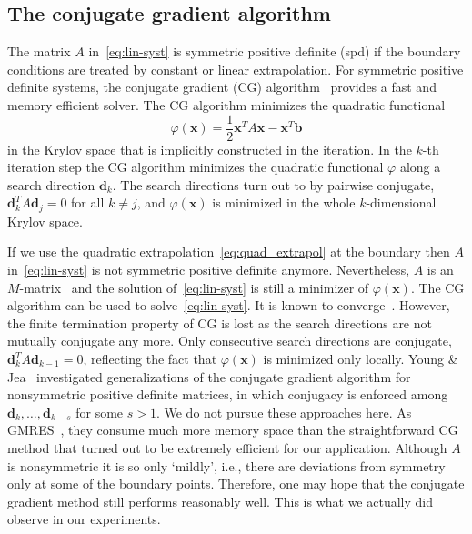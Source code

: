 \documentclass[a4paper,10pt,3p,final,pdftex]{elsarticle}
\begin{document}
\subsection{The conjugate gradient algorithm}

The matrix $A$ in~\eqref{eq:lin-syst} is symmetric positive definite
(spd) if the boundary conditions are treated by constant or linear
extrapolation.  For symmetric positive definite systems, the conjugate
gradient (CG) algorithm~\cite{hack:94,hest:52} provides a fast and
memory efficient solver.  The CG algorithm minimizes the quadratic
functional
\begin{equation} \label{eq:cg-funct}
  \varphi(\mathbf{x}) = \frac{1}{2}\mathbf{x}^T A \mathbf{x} - \mathbf{x}^T
  \mathbf{b}
\end{equation}
in the Krylov space that is implicitly constructed in the iteration.  In
the $k$-th iteration step the CG algorithm minimizes the quadratic
functional $\varphi$ along a search direction $\mathbf{d}_k$.  The search
directions turn out to by pairwise conjugate, $\mathbf{d}_k^T A
\mathbf{d}_j = 0$ for all $k\neq j$, and $\varphi(\mathbf{x})$ is
minimized in the whole $k$-dimensional Krylov space.

If we use the quadratic extrapolation~\eqref{eq:quad_extrapol} at the
boundary then $A$ in~\eqref{eq:lin-syst} is not symmetric positive
definite anymore.  Nevertheless, $A$ is an $M$-matrix~\cite{hack:94} and
the solution of~\eqref{eq:lin-syst} is still a minimizer of
$\varphi(\mathbf{x})$.  The CG algorithm can be used to
solve~\eqref{eq:lin-syst}.  It is known to converge~\cite{gree:97}.
However, the finite termination property of CG is lost as the search
directions are not mutually conjugate any more.  Only consecutive search
directions are conjugate, $\mathbf{d}_k^T A \mathbf{d}_{k-1} = 0$,
reflecting the fact that $\varphi(\mathbf{x})$ is minimized only
locally.
Young \& Jea~\cite{yoje:80} investigated generalizations of the
conjugate gradient algorithm for nonsymmetric positive definite
matrices, in which conjugacy is enforced among $\mathbf{d}_k, \ldots,
\mathbf{d}_{k-s}$ for some $s>1$.  We do not pursue these approaches
here.  As GMRES~\cite{sasc:86}, they consume much more memory space than
the straightforward CG method that turned out to be extremely efficient
for our application.  Although $A$ is nonsymmetric it is so only
`mildly', i.e., there are deviations from symmetry only at some of
the boundary points.  Therefore, one may hope that the conjugate
gradient method still performs reasonably well.  This is what we
actually did observe in our experiments.
\end{document}
